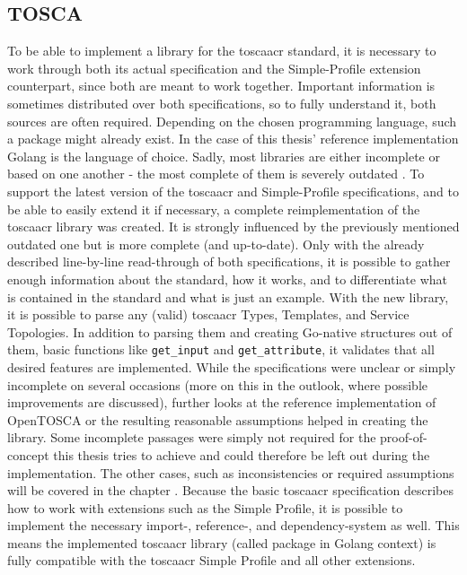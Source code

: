 \subsection{TOSCA}
To be able to implement a library for the \gls{toscaacr} standard, it is necessary to work through both its actual specification and the Simple-Profile extension counterpart, since both are meant to work together. Important information is sometimes distributed over both specifications, so to fully understand it, both sources are often required.
\newline
Depending on the chosen programming language, such a package might already exist. In the case of this thesis' reference implementation Golang is the language of choice. Sadly, most libraries are either incomplete or based on one another - the most complete of them is severely outdated \cite{github_toscalib_forks}.
\newline
To support the latest version of the \gls{toscaacr} and Simple-Profile specifications, and to be able to easily extend it if necessary, a complete reimplementation of the \gls{toscaacr} library was created. It is strongly influenced by the previously mentioned outdated one but is more complete (and up-to-date). Only with the already described line-by-line read-through of both specifications, it is possible to gather enough information about the standard, how it works, and to differentiate what is contained in the standard and what is just an example.
\newline
With the new library, it is possible to parse any (valid) \gls{toscaacr} Types, Templates, and Service Topologies.
In addition to parsing them and creating Go-native structures out of them, basic functions like \texttt{get_input} and \texttt{get_attribute}, it validates that all desired features are implemented. While the specifications were unclear or simply incomplete on several occasions (more on this in the outlook, where possible improvements are discussed), further looks at the reference implementation of OpenTOSCA or the resulting reasonable assumptions helped in creating the library. Some incomplete passages were simply not required for the proof-of-concept this thesis tries to achieve and could therefore be left out during the implementation. The other cases, such as inconsistencies or required assumptions will be covered in the chapter . %
\newline
Because the basic \gls{toscaacr} specification describes how to work with extensions such as the Simple Profile, it is possible to implement the necessary import-, reference-, and dependency-system as well. This means the implemented \gls{toscaacr} library (called package in Golang context) is fully compatible with the \gls{toscaacr} Simple Profile and all other extensions.
